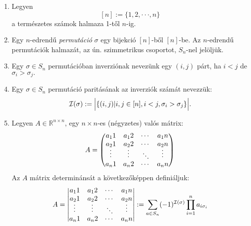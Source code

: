 \documentclass{article}
\begin{document}
    \begin{enumerate}[label=\alph*)]
    \item 
        Legyen
            \[ [n] := \{ 1, 2, \cdot \cdot \cdot , n \}\]
        a természetes számok halmaza 1-től $n$-ig.
    
    \item
       Egy $n$-edrendű \textit{permutáció} $\sigma$ egy bijekció $[n]$-ből $[n]$-be. Az $n$-edrendű permutációk halmazát, az ún. szimmetrikus csoportot, $S_n$-nel jelöljük.
    
    \item
        Egy $\sigma \in S_n$ permutációban inverziónak nevezünk egy $(i, j)$ párt, ha $i < j$
        de $\sigma_i > \sigma_j.$
    
    \item
       Egy $\sigma \in S_n$ permutáció paritásának az inverziók számát nevezzük:
        \[ \mathcal{I}(\sigma) := \Bigl\vert \{(i, j) | i, j \in [n], i < j, \sigma_i > \sigma_j\} \Bigr\vert . \]

    \item
        Legyen $ A \in \mathbb{R}^{n\times n} $, egy $n \times n$-es (négyzetes) valós mátrix:
                     \[ A = \left( \begin{matrix}
                                    a_11 & a_12 & \cdots & a_1n \\
                                    a_21 & a_22 & \cdots & a_2n \\
                                    \rotatebox{90}{$\cdots$} & \rotatebox{90}{$\cdots$} & \rotatebox{135}{$\cdots$} & \rotatebox{90}{$\cdots$}\\
                                    a_n1 & a_n2 & \cdots & a_nn \\
                                \end{matrix} \right) \]
        Az $A$ mátrix determinánsát a következőképpen definiáljuk:
                    \[ A = \left\vert \begin{matrix}
                                    a_11 & a_12 & \cdots & a_1n \\
                                    a_21 & a_22 & \cdots & a_2n \\
                                    \rotatebox{90}{$\cdots$} & \rotatebox{90}{$\cdots$} & \rotatebox{135}{$\cdots$} & \rotatebox{90}{$\cdots$}\\
                                    a_n1 & a_n2 & \cdots & a_nn \\
                                \end{matrix} \right\vert 
                                := \sum_{a \in S_n} (-1)^{\mathcal{I}(\sigma)} \prod_{i=1}^n a_{i\sigma_i} \]
        
    \end{enumerate}
\end{document}
